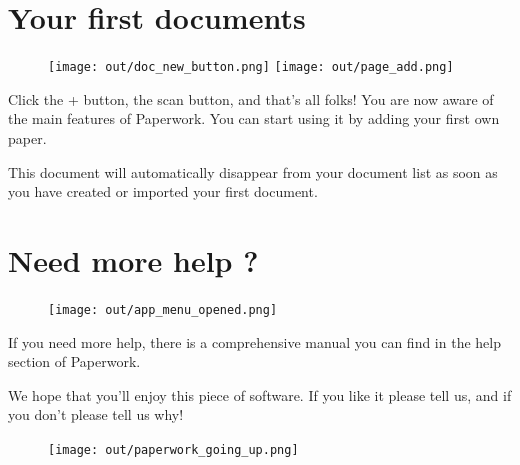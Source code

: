 \documentclass[10pt,a4paper]{article}
\begin{document}
\section{Your first documents}

\begin{figure}[h]
	\centering
	\texttt{[image: out/doc\_new\_button.png]}
	\texttt{[image: out/page\_add.png]}
\end{figure}

Click the + button, the scan button, and that's all folks! You are now aware
of the main features of Paperwork. You can start using it by adding your first
own paper.

This document will automatically disappear from your document list as soon
as you have created or imported your first document.


\section{Need more help ?}

\begin{figure}[H]
	\centering
	\texttt{[image: out/app\_menu\_opened.png]}
\end{figure}

If you need more help, there is a comprehensive manual you can find in the help
section of Paperwork.

We hope that you'll enjoy this piece of software. If you like it please tell
us, and if you don't please tell us why!

\begin{figure}[b]
	\texttt{[image: out/paperwork\_going\_up.png]}
\end{figure}
\end{document}
